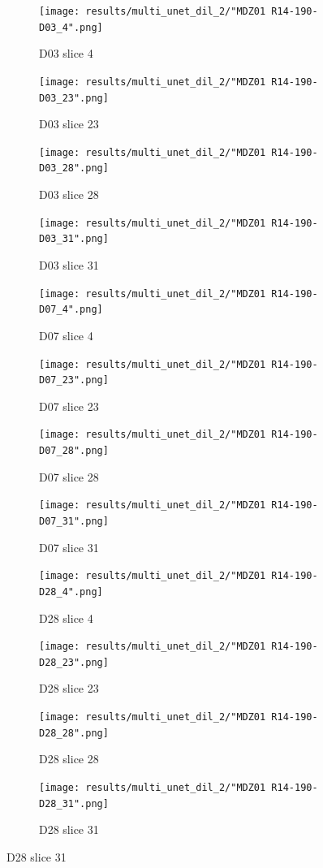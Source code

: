 \begin{figure}[!htb]  
    \centering %
\begin{subfigure}{0.25\textwidth}
  \texttt{[image: results/multi\_unet\_dil\_2/"MDZ01 R14-190-D03\_4".png]}
  \caption{D03 slice 4}
\end{subfigure}\hfil %
\begin{subfigure}{0.25\textwidth}
  \texttt{[image: results/multi\_unet\_dil\_2/"MDZ01 R14-190-D03\_23".png]}
  \caption{D03 slice 23}
\end{subfigure}\hfil %
\begin{subfigure}{0.25\textwidth}
  \texttt{[image: results/multi\_unet\_dil\_2/"MDZ01 R14-190-D03\_28".png]}
  \caption{D03 slice 28}
\end{subfigure}\hfil %
\begin{subfigure}{0.25\textwidth}
  \texttt{[image: results/multi\_unet\_dil\_2/"MDZ01 R14-190-D03\_31".png]}
  \caption{D03 slice 31}
\end{subfigure}

\medskip
\begin{subfigure}{0.25\textwidth}
  \texttt{[image: results/multi\_unet\_dil\_2/"MDZ01 R14-190-D07\_4".png]}
  \caption{D07 slice 4}
\end{subfigure}\hfil %
\begin{subfigure}{0.25\textwidth}
  \texttt{[image: results/multi\_unet\_dil\_2/"MDZ01 R14-190-D07\_23".png]}
  \caption{D07 slice 23}
\end{subfigure}\hfil %
\begin{subfigure}{0.25\textwidth}
  \texttt{[image: results/multi\_unet\_dil\_2/"MDZ01 R14-190-D07\_28".png]}
  \caption{D07 slice 28}
\end{subfigure}\hfil %
\begin{subfigure}{0.25\textwidth}
  \texttt{[image: results/multi\_unet\_dil\_2/"MDZ01 R14-190-D07\_31".png]}
  \caption{D07 slice 31}
\end{subfigure}

\medskip
\begin{subfigure}{0.25\textwidth}
  \texttt{[image: results/multi\_unet\_dil\_2/"MDZ01 R14-190-D28\_4".png]}
  \caption{D28 slice 4}
\end{subfigure}\hfil %
\begin{subfigure}{0.25\textwidth}
  \texttt{[image: results/multi\_unet\_dil\_2/"MDZ01 R14-190-D28\_23".png]}
  \caption{D28 slice 23}
\end{subfigure}\hfil %
\begin{subfigure}{0.25\textwidth}
  \texttt{[image: results/multi\_unet\_dil\_2/"MDZ01 R14-190-D28\_28".png]}
  \caption{D28 slice 28}
\end{subfigure}\hfil %
\begin{subfigure}{0.25\textwidth}
  \texttt{[image: results/multi\_unet\_dil\_2/"MDZ01 R14-190-D28\_31".png]}
  \caption{D28 slice 31}
\end{subfigure}
  

\end{figure}
